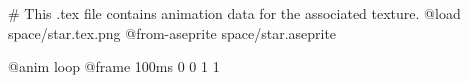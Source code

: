 # This .tex file contains animation data for the associated texture.
@load space/star.tex.png
@from-aseprite space/star.aseprite

@anim loop
	@frame 100ms 0 0 1 1

